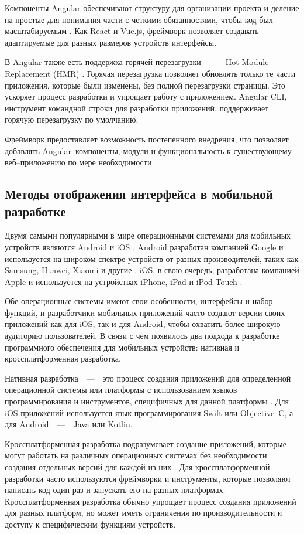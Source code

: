 Компоненты Angular обеспечивают структуру для организации проекта и деление на простые для понимания части с четкими обязанностями, чтобы код был масштабируемым \cite{angular-components}.
Как React и Vue.js, фреймворк позволяет создавать адаптируемые для разных размеров устройств интерфейсы.

В Angular также есть поддержка горячей перезагрузки~~---~~Hot Module Replacement (HMR) \cite{angular-hmr}. 
Горячая перезагрузка позволяет обновлять только те части приложения, которые были изменены, без полной перезагрузки страницы. 
Это ускоряет процесс разработки и упрощает работу с приложением.
Angular CLI, инструмент командной строки для разработки приложений, поддерживает горячую перезагрузку по умолчанию.

Фреймворк предоставляет возможность постепенного внедрения, что позволяет добавлять Angular--компоненты, модули и функциональность к существующему веб--приложению по мере необходимости.


\subsection{Методы отображения интерфейса в мобильной разработке} 

Двумя самыми популярными в мире операционными системами для мобильных устройств являются Android и iOS \cite{mob-os-stat}. 
Android разработан компанией Google и используется на широком спектре устройств от разных производителей, таких как Samsung, Huawei, Xiaomi и другие \cite{android}.
iOS, в свою очередь, разработана компанией Apple и используется на устройствах iPhone, iPad и iPod Touch \cite{ios}. 

Обе операционные системы имеют свои особенности, интерфейсы и набор функций, и разработчики мобильных приложений часто создают версии своих приложений как для iOS, так и для Android, чтобы охватить более широкую аудиторию пользователей. 
В связи с чем появилось два подхода к разработке программного обеспечения для мобильных устройств: нативная и кроссплатформенная разработка. 

Нативная разработка~~---~~это процесс создания приложений для определенной операционной системы или платформы с использованием языков программирования и инструментов, специфичных для данной платформы \cite{native-crossplatform}. 
Для iOS приложений используется язык программирования Swift или Objective--C, а для Android~~---~~Java или Kotlin.

Кроссплатформенная разработка подразумевает создание приложений, которые могут работать на различных операционных системах без необходимости создания отдельных версий для каждой из них \cite{native-crossplatform}. 
Для кроссплатформенной разработки часто используются фреймворки и инструменты, которые позволяют написать код один раз и запускать его на разных платформах. 
Кроссплатформенная разработка обычно упрощает процесс создания приложений для разных платформ, но может иметь ограничения по производительности и доступу к специфическим функциям устройств.


